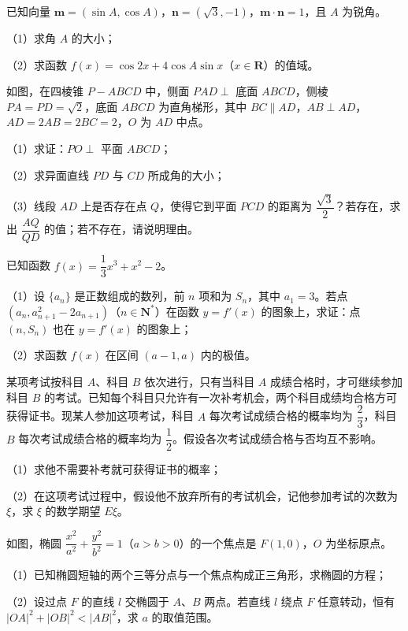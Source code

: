 \begin{question}
已知向量 $\boldsymbol m=(\sin A,\cos A)$，$\boldsymbol n=(\sqrt3,-1)$，$\boldsymbol m\cdot\boldsymbol n=1$，且 $A$ 为锐角。

（1）求角 $A$ 的大小；

（2）求函数 $f(x)=\cos 2x+4\cos A\sin x$（$x\in\mathbf R$）的值域。

\Needspace{0.4\textheight}
\end{question}
\begin{question}
如图，在四棱锥 $P-ABCD$ 中，侧面 $PAD\perp$ 底面 $ABCD$，侧棱 $PA=PD=\sqrt2$，底面 $ABCD$ 为直角梯形，其中 $BC\parallel AD$，$AB\perp AD$，$AD=2AB=2BC=2$，$O$ 为 $AD$ 中点。

（1）求证：$PO\perp$ 平面 $ABCD$；

（2）求异面直线 $PD$ 与 $CD$ 所成角的大小；

（3）线段 $AD$ 上是否存在点 $Q$，使得它到平面 $PCD$ 的距离为 $\dfrac{\sqrt3}{2}$？若存在，求出 $\dfrac{AQ}{QD}$ 的值；若不存在，请说明理由。
\nopagebreak[4]
\begin{center}\end{center}
\nopagebreak[4]
\end{question}
\begin{question}
已知函数 $f(x)=\dfrac13x^3+x^2-2$。

（1）设 $\{a_n\}$ 是正数组成的数列，前 $n$ 项和为 $S_n$，其中 $a_1=3$。若点 $(a_n,a_{n+1}^2-2a_{n+1})$（$n\in\mathbf N^*$）在函数 $y=f'(x)$ 的图象上，求证：点 $(n,S_n)$ 也在 $y=f'(x)$ 的图象上；

（2）求函数 $f(x)$ 在区间 $(a-1,a)$ 内的极值。

\end{question}
\begin{question}
某项考试按科目 $A$、科目 $B$ 依次进行，只有当科目 $A$ 成绩合格时，才可继续参加科目 $B$ 的考试。已知每个科目只允许有一次补考机会，两个科目成绩均合格方可获得证书。现某人参加这项考试，科目 $A$ 每次考试成绩合格的概率均为 $\dfrac23$，科目 $B$ 每次考试成绩合格的概率均为 $\dfrac12$。假设各次考试成绩合格与否均互不影响。

（1）求他不需要补考就可获得证书的概率；

（2）在这项考试过程中，假设他不放弃所有的考试机会，记他参加考试的次数为 $\xi$，求 $\xi$ 的数学期望 $E\xi$。

\Needspace{0.4\textheight}
\end{question}
\begin{question}
如图，椭圆 $\dfrac{x^2}{a^2}+\dfrac{y^2}{b^2}=1$（$a>b>0$）的一个焦点是 $F(1,0)$，$O$ 为坐标原点。

（1）已知椭圆短轴的两个三等分点与一个焦点构成正三角形，求椭圆的方程；

（2）设过点 $F$ 的直线 $l$ 交椭圆于 $A$、$B$ 两点。若直线 $l$ 绕点 $F$ 任意转动，恒有 $|OA|^2+|OB|^2<|AB|^2$，求 $a$ 的取值范围。
\nopagebreak[4]
\begin{center}\end{center}
\nopagebreak[4]
\end{question}
